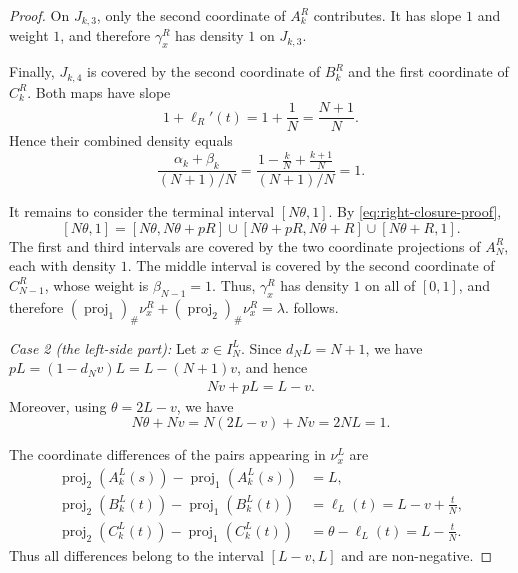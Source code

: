\documentclass{article}
\newcommand{\lam}{\lambda}
\begin{document}
\begin{proof}
On \(J_{k,3}\), only the second coordinate of \(A_k^R\) contributes.
It has slope \(1\) and weight \(1\), and therefore \(\gamma_x^R\) has density \(1\) on \(J_{k,3}\).

Finally, \(J_{k,4}\) is covered by the second coordinate of \(B_k^R\) and the first coordinate of \(C_k^R\).
Both maps have slope
\[
    1+\ell_R'(t)
    =
    1+\frac1N
    =
    \frac{N+1}{N}.
\]
Hence their combined density equals
\[
    \frac{\alpha_k+\beta_k}{(N+1)/N}
    =
    \frac{
        1-\frac{k}{N}+\frac{k+1}{N}
    }{(N+1)/N}
    =1.
\]

It remains to consider the terminal interval \([N\theta,1]\).
By \eqref{eq:right-closure-proof},
\[
    [N\theta,1]
    =
    [N\theta,N\theta+pR]
    \cup
    [N\theta+pR,N\theta+R]
    \cup
    [N\theta+R,1].
\]
The first and third intervals are covered by the two coordinate projections of \(A_N^R\), each with density \(1\).
The middle interval is covered by the second coordinate of \(C_{N-1}^R\), whose weight is
\(
    \beta_{N-1}=1.
\)
Thus, \(\gamma_x^R\) has density \(1\) on all of \([0,1]\), and therefore \((\operatorname{proj}_1)_\#\nu_x^R + (\operatorname{proj}_2)_\#\nu_x^R = \lam. \) follows.

\medskip
\noindent
\emph{Case 2 (the left-side part): } Let \(x\in I_N^L\).
Since \(d_NL=N+1\), we have \(pL=(1-d_Nv)L=L-(N+1)v\), and hence
\begin{align}\label{eq:left-identities-proof}
    Nv+pL=L-v.
\end{align}
Moreover, using \(\theta=2L-v\), we have
\begin{equation}\label{eq:left-closure-proof}
    N\theta+Nv
    =
    N(2L-v)+Nv
    =
    2NL
    =
    1.
\end{equation}

The coordinate differences of the pairs appearing in \(\nu_x^L\) are
\[
\begin{aligned}
    \operatorname{proj}_2(A_k^L(s))
    -
    \operatorname{proj}_1(A_k^L(s))
    &=L,\\
    \operatorname{proj}_2(B_k^L(t))
    -
    \operatorname{proj}_1(B_k^L(t))
    &=\ell_L(t)
      =L-v+\frac{t}{N},\\
    \operatorname{proj}_2(C_k^L(t))
    -
    \operatorname{proj}_1(C_k^L(t))
    &=\theta-\ell_L(t)
      =L-\frac{t}{N}.
\end{aligned}
\]
Thus all differences belong to the interval \([L-v,L]\) and are non-negative.


\end{proof}
\end{document}
